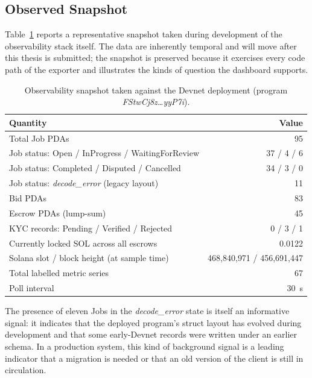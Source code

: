\subsection{Observed Snapshot}
\label{subsection:4.7.5}

Table~\ref{table:obs_snapshot} reports a representative snapshot taken during development of the observability stack itself. The data are inherently temporal and will move after this thesis is submitted; the snapshot is preserved because it exercises every code path of the exporter and illustrates the kinds of question the dashboard supports.

\begin{table}[H]
\centering
\caption{Observability snapshot taken against the Devnet deployment (program \emph{FStwCj8z\ldots yyP7i}).}
\label{table:obs_snapshot}
\small
\begin{tabular}{|l|r|}
\hline
\textbf{Quantity} & \textbf{Value} \\ \hline
Total Job PDAs & 95 \\ \hline
Job status: Open / InProgress / WaitingForReview & 37 / 4 / 6 \\ \hline
Job status: Completed / Disputed / Cancelled & 34 / 3 / 0 \\ \hline
Job status: \emph{decode\_error} (legacy layout) & 11 \\ \hline
Bid PDAs & 83 \\ \hline
Escrow PDAs (lump-sum) & 45 \\ \hline
KYC records: Pending / Verified / Rejected & 0 / 3 / 1 \\ \hline
Currently locked SOL across all escrows & 0.0122 \\ \hline
Solana slot / block height (at sample time) & 468{,}840{,}971 / 456{,}691{,}447 \\ \hline
Total labelled metric series & 67 \\ \hline
Poll interval & 30~s \\ \hline
\end{tabular}
\end{table}

\noindent The presence of eleven Jobs in the \emph{decode\_error} state is itself an informative signal: it indicates that the deployed program's struct layout has evolved during development and that some early-Devnet records were written under an earlier schema. In a production system, this kind of background signal is a leading indicator that a migration is needed or that an old version of the client is still in circulation.

